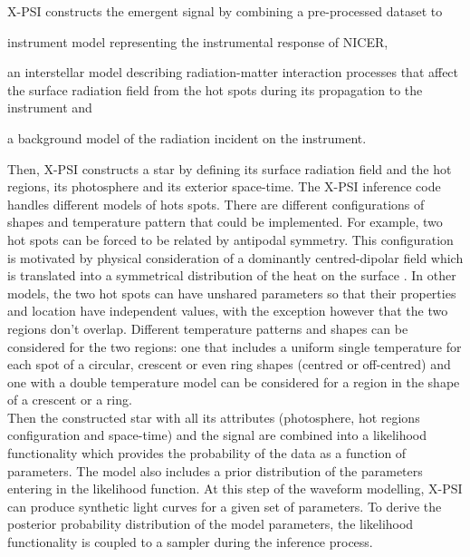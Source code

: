 \documentclass[a4paper, twoside, 12pt]{article}
\numberwithin{equation}{section}
\begin{document}
X-PSI constructs the emergent signal by combining a pre-processed dataset to \begin{enumerate*}[label = \roman*)]
\item instrument model representing the instrumental response of NICER,
\item an interstellar model describing radiation-matter interaction processes that affect the surface radiation field from the hot spots during its propagation to the instrument and
\item  a background model of the radiation incident on the instrument. 
\end{enumerate*}  Then, X-PSI constructs a star by defining its surface radiation field and the hot regions, its photosphere and its exterior space-time. The X-PSI inference code handles different models of hots spots. There are different configurations of shapes and temperature pattern that could be implemented. For example, two hot spots can be forced to be related by antipodal symmetry. This configuration is motivated by physical consideration of a dominantly centred-dipolar field which is translated into a symmetrical distribution of the heat on the surface \cite{Riley+19}. In other models, the two hot spots can have unshared parameters so that their properties and location have independent values, with the exception however that the two regions don't overlap. Different temperature patterns and shapes can be considered for the two regions: one that includes a uniform single temperature for each spot of a circular, crescent or even ring shapes (centred or off-centred) and one with a double temperature model can be considered for a region in the shape of a crescent or a ring. \\

Then the constructed star with all its attributes (photosphere, hot regions configuration and space-time) and the signal are combined into a likelihood functionality which provides the probability of the data as a function of parameters. The model also includes a prior distribution of the parameters entering in the likelihood function.  At this step of the waveform modelling, X-PSI can produce synthetic light curves for a given set of parameters. To derive the posterior probability distribution of the model parameters, the likelihood functionality is coupled to a sampler during the inference process.\\


\newpage
\end{document}
